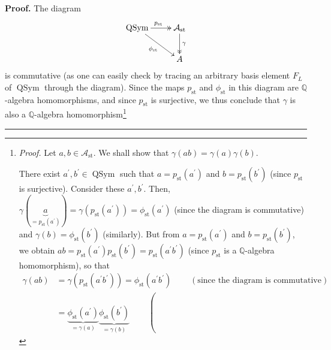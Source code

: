 \documentclass[numbers=enddot,12pt,final,onecolumn,notitlepage]{scrartcl}%
\makeatletter
\theoremstyle{definition}
\newenvironment{proof}[1][Proof]{\noindent\textbf{#1.} }{\ \rule{0.5em}{0.5em}}
\newcommand{\QSym}{\operatorname{QSym}}
\newcommand{\arsurj}{\ar@{->>}}
\makeatother
\begin{document}
\begin{proof}
The diagram%
\[%
\xymatrix{
\QSym\arsurj[r]^{p_{\operatorname{st}}} \ar[dr]_{\phi_{\operatorname{st}}}
& \mathcal{A}_{\operatorname{st}} \arsurj[d]^\gamma\\
& A
}%
\]
is commutative (as one can easily check by tracing an arbitrary basis element
$F_{L}$ of $\operatorname*{QSym}$ through the diagram). Since the maps
$p_{\operatorname*{st}}$ and $\phi_{\operatorname*{st}}$ in this diagram are
$\mathbb{Q}$-algebra homomorphisms, and since $p_{\operatorname*{st}}$ is
surjective, we thus conclude that $\gamma$ is also a $\mathbb{Q}$-algebra
homomorphism\footnote{\textit{Proof.} Let $a,b\in\mathcal{A}%
_{\operatorname*{st}}$. We shall show that $\gamma\left(  ab\right)
=\gamma\left(  a\right)  \gamma\left(  b\right)  $.
\par
There exist $a^{\prime},b^{\prime}\in\operatorname*{QSym}$ such that
$a=p_{\operatorname*{st}}\left(  a^{\prime}\right)  $ and
$b=p_{\operatorname*{st}}\left(  b^{\prime}\right)  $ (since
$p_{\operatorname*{st}}$ is surjective). Consider these $a^{\prime},b^{\prime
}$. Then, $\gamma\left(  \underbrace{a}_{=p_{\operatorname*{st}}\left(
a^{\prime}\right)  }\right)  =\gamma\left(  p_{\operatorname*{st}}\left(
a^{\prime}\right)  \right)  =\phi_{\operatorname*{st}}\left(  a^{\prime
}\right)  $ (since the diagram is commutative) and $\gamma\left(  b\right)
=\phi_{\operatorname*{st}}\left(  b^{\prime}\right)  $ (similarly). But from
$a=p_{\operatorname*{st}}\left(  a^{\prime}\right)  $ and
$b=p_{\operatorname*{st}}\left(  b^{\prime}\right)  $, we obtain
$ab=p_{\operatorname*{st}}\left(  a^{\prime}\right)  p_{\operatorname*{st}%
}\left(  b^{\prime}\right)  =p_{\operatorname*{st}}\left(  a^{\prime}%
b^{\prime}\right)  $ (since $p_{\operatorname*{st}}$ is a $\mathbb{Q}$-algebra
homomorphism), so that%
\begin{align*}
\gamma\left(  ab\right)   &  =\gamma\left(  p_{\operatorname*{st}}\left(
a^{\prime}b^{\prime}\right)  \right)  =\phi_{\operatorname*{st}}\left(
a^{\prime}b^{\prime}\right)  \ \ \ \ \ \ \ \ \ \ \left(  \text{since the
diagram is commutative}\right) \\
&  =\underbrace{\phi_{\operatorname*{st}}\left(  a^{\prime}\right)  }%
_{=\gamma\left(  a\right)  }\underbrace{\phi_{\operatorname*{st}}\left(
b^{\prime}\right)  }_{=\gamma\left(  b\right)  }\ \ \ \ \ \ \ \ \ \ \left(

\end{align*}}
\end{proof}
\end{document}
